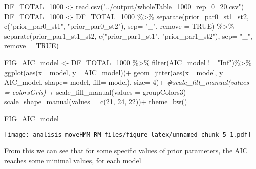 \documentclass[
]{article}
\newenvironment{Shaded}{\begin{snugshade}}{\end{snugshade}}
\newcommand{\AttributeTok}[1]{\textcolor[rgb]{0.77,0.63,0.00}{#1}}
\newcommand{\CommentTok}[1]{\textcolor[rgb]{0.56,0.35,0.01}{\textit{#1}}}
\newcommand{\ConstantTok}[1]{\textcolor[rgb]{0.00,0.00,0.00}{#1}}
\newcommand{\DecValTok}[1]{\textcolor[rgb]{0.00,0.00,0.81}{#1}}
\newcommand{\FunctionTok}[1]{\textcolor[rgb]{0.00,0.00,0.00}{#1}}
\newcommand{\NormalTok}[1]{#1}
\newcommand{\OtherTok}[1]{\textcolor[rgb]{0.56,0.35,0.01}{#1}}
\newcommand{\SpecialCharTok}[1]{\textcolor[rgb]{0.00,0.00,0.00}{#1}}
\newcommand{\StringTok}[1]{\textcolor[rgb]{0.31,0.60,0.02}{#1}}
\begin{document}
\begin{Shaded}
\begin{Highlighting}[]
\NormalTok{DF\_TOTAL\_1000 }\OtherTok{\textless{}{-}} \FunctionTok{read.csv}\NormalTok{(}\StringTok{"../output/wholeTable\_1000\_rep\_0\_20.csv"}\NormalTok{)}
\NormalTok{DF\_TOTAL\_1000 }\OtherTok{\textless{}{-}}\NormalTok{ DF\_TOTAL\_1000 }\SpecialCharTok{\%\textgreater{}\%}
  \FunctionTok{separate}\NormalTok{(prior\_par0\_st1\_st2, }\FunctionTok{c}\NormalTok{(}\StringTok{"prior\_par0\_st1"}\NormalTok{, }\StringTok{"prior\_par0\_st2"}\NormalTok{), }\AttributeTok{sep=} \StringTok{"\_"}\NormalTok{, }\AttributeTok{remove =} \ConstantTok{TRUE}\NormalTok{) }\SpecialCharTok{\%\textgreater{}\%}
  \FunctionTok{separate}\NormalTok{(prior\_par1\_st1\_st2, }\FunctionTok{c}\NormalTok{(}\StringTok{"prior\_par1\_st1"}\NormalTok{, }\StringTok{"prior\_par1\_st2"}\NormalTok{), }\AttributeTok{sep=} \StringTok{"\_"}\NormalTok{, }\AttributeTok{remove =} \ConstantTok{TRUE}\NormalTok{)}



\NormalTok{FIG\_AIC\_model }\OtherTok{\textless{}{-}}\NormalTok{ DF\_TOTAL\_1000 }\SpecialCharTok{\%\textgreater{}\%} 
  \FunctionTok{filter}\NormalTok{(AIC\_model }\SpecialCharTok{!=} \StringTok{"Inf"}\NormalTok{)}\SpecialCharTok{\%\textgreater{}\%} 
  \FunctionTok{ggplot}\NormalTok{(}\FunctionTok{aes}\NormalTok{(}\AttributeTok{x=}\NormalTok{ model, }\AttributeTok{y=}\NormalTok{ AIC\_model))}\SpecialCharTok{+}
  \FunctionTok{geom\_jitter}\NormalTok{(}\FunctionTok{aes}\NormalTok{(}\AttributeTok{x=}\NormalTok{ model, }\AttributeTok{y=}\NormalTok{ AIC\_model, }\AttributeTok{shape=}\NormalTok{ model, }\AttributeTok{fill=}\NormalTok{ model), }\AttributeTok{size=} \DecValTok{4}\NormalTok{)}\SpecialCharTok{+}
  \CommentTok{\#scale\_fill\_manual(values = colorsGris) +}
  \FunctionTok{scale\_fill\_manual}\NormalTok{(}\AttributeTok{values =}\NormalTok{ groupColors3) }\SpecialCharTok{+}
  \FunctionTok{scale\_shape\_manual}\NormalTok{(}\AttributeTok{values =} \FunctionTok{c}\NormalTok{(}\DecValTok{21}\NormalTok{, }\DecValTok{24}\NormalTok{, }\DecValTok{22}\NormalTok{))}\SpecialCharTok{+}
  \FunctionTok{theme\_bw}\NormalTok{()}

\NormalTok{FIG\_AIC\_model}
\end{Highlighting}
\end{Shaded}

\texttt{[image: analisis\_moveHMM\_RM\_files/figure-latex/unnamed-chunk-5-1.pdf]}

From this we can see that for some specific values of prior parameters,
the AIC reaches some minimal values, for each model
\end{document}
